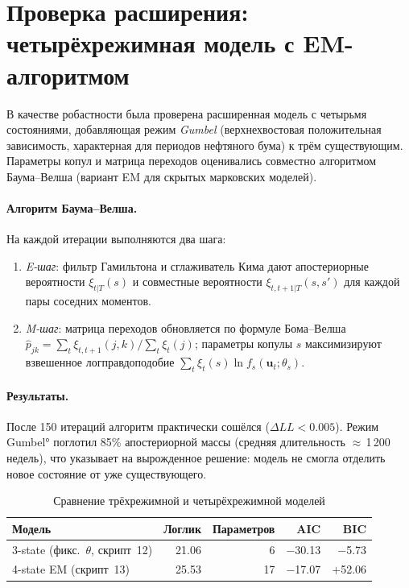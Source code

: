 \section{Проверка расширения: четырёхрежимная модель с EM-алгоритмом}

В качестве робастности была проверена расширенная модель с четырьмя
состояниями, добавляющая режим \emph{Gumbel} (верхнехвостовая положительная
зависимость, характерная для периодов нефтяного бума) к трём существующим.
Параметры копул и матрица переходов оценивались совместно алгоритмом
Баума--Велша (вариант EM для скрытых марковских моделей).

\paragraph{Алгоритм Баума--Велша.}
На каждой итерации выполняются два шага:
\begin{enumerate}
  \item \emph{E-шаг}: фильтр Гамильтона и сглаживатель Кима дают
        апостериорные вероятности $\xi_{t|T}(s)$ и совместные
        вероятности $\xi_{t,t+1|T}(s,s')$ для каждой пары соседних моментов.
  \item \emph{M-шаг}: матрица переходов обновляется по формуле Бома--Велша
        $\hat{p}_{jk} = \sum_t \xi_{t,t+1}(j,k) / \sum_t \xi_t(j)$;
        параметры копулы $s$ максимизируют взвешенное логправдоподобие
        $\sum_t \xi_t(s) \ln f_s(\mathbf{u}_t;\theta_s)$.
\end{enumerate}

\paragraph{Результаты.}
После 150 итераций алгоритм практически сошёлся ($\Delta LL < 0.005$).
Режим Gumbel° поглотил 85\% апостериорной массы (средняя длительность
$\approx$\,1\,200 недель), что указывает на вырожденное решение:
модель не смогла отделить новое состояние от уже существующего.

\begin{table}[ht]
\centering
\caption{Сравнение трёхрежимной и четырёхрежимной моделей}
\label{tab:model_compare}
\begin{tabular}{lrrrr}
\toprule
Модель & Логлик & Параметров & AIC & BIC \\
\midrule
3-state (фикс.\ $\theta$, скрипт~12) & 21.06 & 6  & $-$30.13 & $-$5.73 \\
4-state EM (скрипт~13)              & 25.53 & 17 & $-$17.07 & $+$52.06 \\
\bottomrule
\end{tabular}
\end{table}

